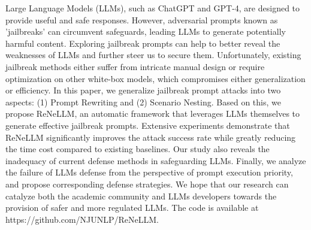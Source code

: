 Large Language Models (LLMs), such as ChatGPT and GPT-4, are designed to provide useful and safe responses. However, adversarial prompts known as 'jailbreaks' can circumvent safeguards, leading LLMs to generate potentially harmful content. Exploring jailbreak prompts can help to better reveal the weaknesses of LLMs and further steer us to secure them. Unfortunately, existing jailbreak methods either suffer from intricate manual design or require optimization on other white-box models, which compromises either generalization or efficiency. In this paper, we generalize jailbreak prompt attacks into two aspects: (1) Prompt Rewriting and (2) Scenario Nesting. Based on this, we propose ReNeLLM, an automatic framework that leverages LLMs themselves to generate effective jailbreak prompts. Extensive experiments demonstrate that ReNeLLM significantly improves the attack success rate while greatly reducing the time cost compared to existing baselines. Our study also reveals the inadequacy of current defense methods in safeguarding LLMs. Finally, we analyze the failure of LLMs defense from the perspective of prompt execution priority, and propose corresponding defense strategies. We hope that our research can catalyze both the academic community and LLMs developers towards the provision of safer and more regulated LLMs. The code is available at https://github.com/NJUNLP/ReNeLLM.